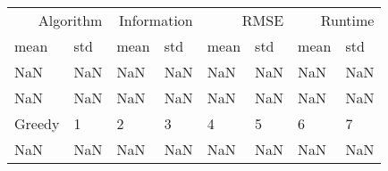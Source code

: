 \begin{tabular}{llllllll}
\toprule
\multicolumn{2}{r}{Algorithm} & \multicolumn{2}{r}{Information} & \multicolumn{2}{r}{RMSE} & \multicolumn{2}{r}{Runtime} \\
mean & std & mean & std & mean & std & mean & std \\
\midrule
NaN & NaN & NaN & NaN & NaN & NaN & NaN & NaN \\
NaN & NaN & NaN & NaN & NaN & NaN & NaN & NaN \\
Greedy & 1 & 2 & 3 & 4 & 5 & 6 & 7 \\
NaN & NaN & NaN & NaN & NaN & NaN & NaN & NaN \\
\bottomrule
\end{tabular}

